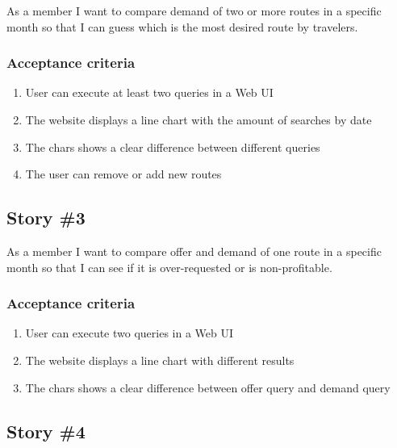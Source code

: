 \begin{displayquote}
As a  member I want to compare demand of two or more routes in a specific month so that I can guess which is the most desired route by travelers.
\end{displayquote}

\subsubsection*{Acceptance criteria}

\begin{enumerate}
    \item User can execute at least two queries in a Web UI
    \item The website displays a line chart with the amount of searches by date
    \item The chars shows a clear difference between different queries
    \item The user can remove or add new routes
\end{enumerate}

\subsection*{Story \#3}

\begin{displayquote}
As a  member I want to compare offer and demand of one route in a specific month so that I can see if it is over-requested or is non-profitable.
\end{displayquote}

\subsubsection*{Acceptance criteria}

\begin{enumerate}
    \item User can execute two queries in a Web UI
    \item The website displays a line chart with different results
    \item The chars shows a clear difference between offer query and demand query
\end{enumerate}

\subsection*{Story \#4}

